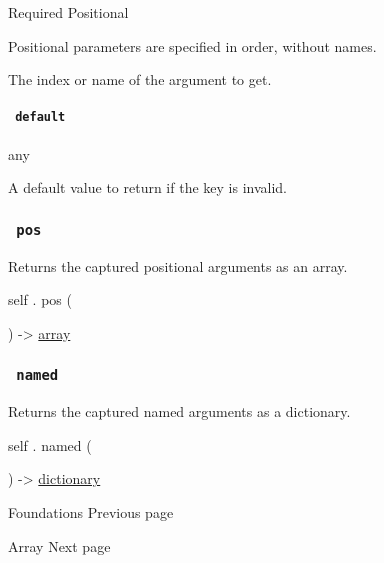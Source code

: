{Required} {{ Positional }}

\label{definitions-at-key-positional-tooltip}
Positional parameters are specified in order, without names.

The index or name of the argument to get.

\paragraph{\texorpdfstring{\texttt{\ default\ }}{ default }}\label{definitions-at-default}

{ any }

A default value to return if the key is invalid.

\subsubsection{\texorpdfstring{\texttt{\ pos\ }}{ pos }}\label{definitions-pos}

Returns the captured positional arguments as an array.

self { . } { pos } (

) -\textgreater{} \href{/docs/reference/foundations/array/}{array}

\subsubsection{\texorpdfstring{\texttt{\ named\ }}{ named }}\label{definitions-named}

Returns the captured named arguments as a dictionary.

self { . } { named } (

) -\textgreater{}
\href{/docs/reference/foundations/dictionary/}{dictionary}

\href{/docs/reference/foundations/}{\pandocbounded{}}

{ Foundations } { Previous page }

\href{/docs/reference/foundations/array/}{\pandocbounded{}}

{ Array } { Next page }
